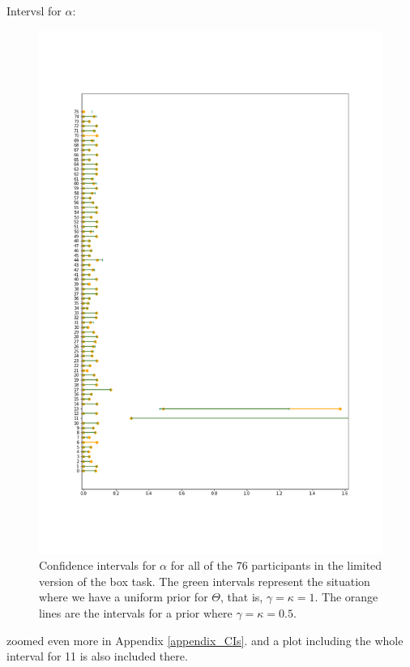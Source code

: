 Intervsl for $\alpha$:
\begin{figure}
    \centering
    \includegraphics[scale=0.38]{pictures/Sensitivity/ci_lim_alpha_zoom1.png}
    \caption[CIs for $\alpha$ for all participants with two different priors, limited]{Confidence intervals for $\alpha$ for all of the 76 participants in the limited version of the box task. The green intervals represent the situation where we have a uniform prior for $\Theta$, that is, $\gamma=\kappa=1$. The orange lines are the intervals for a prior where $\gamma=\kappa=0.5$.}
    \label{fig:sensitivity_ci_lim_alpha_zoom1}
\end{figure}


zoomed even more in Appendix \ref{appendix_CIs}. and a plot including the whole interval for 11 is also included there.


